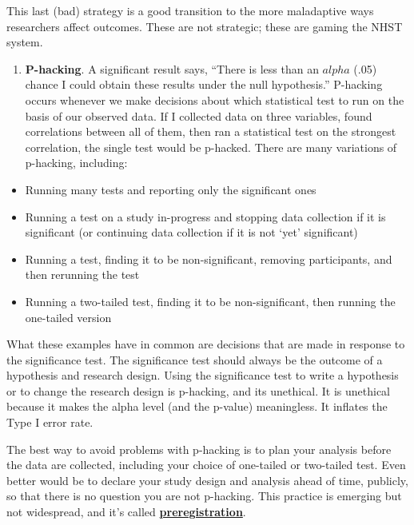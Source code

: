 \documentclass[
]{book}
\providecommand{\tightlist}{%
  \setlength{\itemsep}{0pt}\setlength{\parskip}{0pt}}
\begin{document}
This last (bad) strategy is a good transition to the more maladaptive ways researchers affect outcomes. These are not strategic; these are gaming the NHST system.

\begin{enumerate}
\def\labelenumi{\arabic{enumi}.}
\tightlist
\item
  \textbf{P-hacking}. A significant result says, ``There is less than an \(alpha\) (.05) chance I could obtain these results under the null hypothesis.'' P-hacking occurs whenever we make decisions about which statistical test to run on the basis of our observed data. If I collected data on three variables, found correlations between all of them, then ran a statistical test on the strongest correlation, the single test would be p-hacked. There are many variations of p-hacking, including:
\end{enumerate}

\begin{itemize}
\item
  Running many tests and reporting only the significant ones
\item
  Running a test on a study in-progress and stopping data collection if it is significant (or continuing data collection if it is not `yet' significant)
\item
  Running a test, finding it to be non-significant, removing participants, and then rerunning the test
\item
  Running a two-tailed test, finding it to be non-significant, then running the one-tailed version
\end{itemize}

What these examples have in common are decisions that are made in response to the significance test. The significance test should always be the outcome of a hypothesis and research design. Using the significance test to write a hypothesis or to change the research design is p-hacking, and its unethical. It is unethical because it makes the alpha level (and the p-value) meaningless. It inflates the Type I error rate.

The best way to avoid problems with p-hacking is to plan your analysis before the data are collected, including your choice of one-tailed or two-tailed test. Even better would be to declare your study design and analysis ahead of time, publicly, so that there is no question you are not p-hacking. This practice is emerging but not widespread, and it's called \href{https://www.cos.io/initiatives/prereg}{\textbf{preregistration}}.
\end{document}
